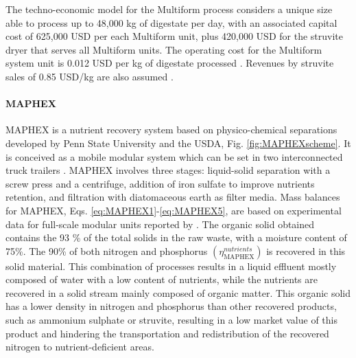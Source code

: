 \begin{refsection}[referencesCh6]
The techno-economic model for the Multiform process considers a unique size able to process up to 48,000 kg of digestate
per day, with an associated capital cost of 625,000 USD per each Multiform unit, plus 420,000 USD for the struvite dryer that serves all Multiform units. The operating cost for the Multiform system unit is 
0.012 USD per kg of digestate processed \citep{AMPC}. Revenues by struvite sales of 0.85 USD/kg are also assumed \citep{molinos2011economic}.

\paragraph{\textbf{MAPHEX}}
MAPHEX is a nutrient recovery system based on physico-chemical separations developed by Penn State University and the USDA, Fig. \ref{fig:MAPHEXscheme}. 
It is conceived as a mobile modular system which can be set in two interconnected truck trailers \citep{church_novel_2016}. MAPHEX involves three stages: liquid-solid separation with a screw press and a centrifuge, addition of iron sulfate to improve nutrients retention, and filtration with diatomaceous earth as filter media. 
Mass balances for MAPHEX, Eqs. \ref{eq:MAPHEX1}-\ref{eq:MAPHEX5}, are based on experimental data for full-scale modular units reported by \citet{church_versatility_2018}. The organic solid obtained contains the 93 \% of the total solids in the raw waste, with a moisture content of 75\%. The 90\% of both nitrogen and phosphorus $\left(\eta_{\text{MAPHEX}}^{{nutrients}}\right)$ is recovered in this solid material.
This combination of processes results in a liquid effluent mostly composed of water with a low content of nutrients, while the nutrients are recovered in a solid stream mainly composed of organic matter. This organic solid has a lower density in nitrogen and phosphorus than other recovered products, such as ammonium sulphate or struvite, resulting in a low market value of this product and hindering the transportation and redistribution of the recovered nitrogen to nutrient-deficient areas.


\end{refsection}
